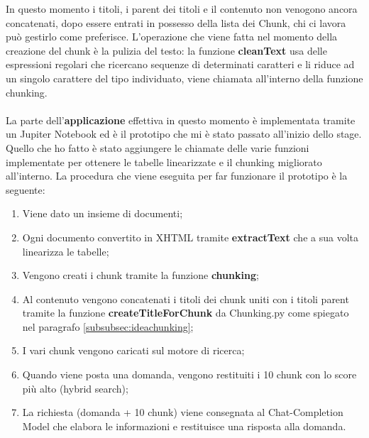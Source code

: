 \noindent In questo momento i titoli, i parent dei titoli e il contenuto non venogono ancora concatenati, dopo essere entrati in possesso della lista dei Chunk, chi ci lavora può gestirlo come preferisce.
L'operazione che viene fatta nel momento della creazione del chunk è la pulizia del testo: la funzione \textbf{cleanText} usa delle espressioni regolari che ricercano sequenze di determinati caratteri e li riduce ad un singolo carattere del tipo individuato, viene chiamata all'interno della funzione chunking.
\\\\
\noindent La parte dell'\textbf{applicazione} effettiva in questo momento è implementata tramite un Jupiter Notebook ed è il prototipo che mi è stato passato all'inizio dello stage.
Quello che ho fatto è stato aggiungere le chiamate delle varie funzioni implementate per ottenere le tabelle linearizzate e il chunking migliorato all'interno.
La procedura che viene eseguita per far funzionare il prototipo è la seguente:
\begin{enumerate}
    \item Viene dato un insieme di documenti;
    \item Ogni documento convertito in XHTML tramite \textbf{extractText} che a sua volta linearizza le tabelle;
    \item Vengono creati i chunk tramite la funzione \textbf{chunking};
    \item Al contenuto vengono concatenati i titoli dei chunk uniti con i titoli parent tramite la funzione \textbf{createTitleForChunk} da Chunking.py come spiegato nel paragrafo \ref{subsubsec:ideachunking};
    \item I vari chunk vengono caricati sul motore di ricerca;
    \item Quando viene posta una domanda, vengono restituiti i 10 chunk con lo score più alto (hybrid search);
    \item La richiesta (domanda + 10 chunk) viene consegnata al Chat-Completion Model che elabora le informazioni e restituisce una risposta alla domanda. 
\end{enumerate}



